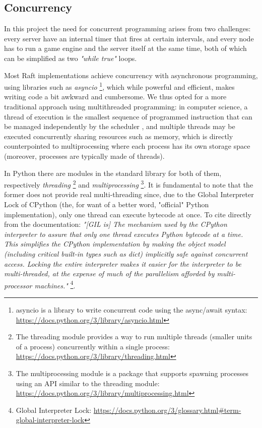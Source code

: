 \subsection{Concurrency} \label{sec:threading}

In this project the need for concurrent programming arises from two challenges: every server have an internal timer that fires at certain intervals, and every node has to run a game engine and the server itself at the same time, both of which can be simplified as two \textit{"while true"} loops. 

Most Raft implementations achieve concurrency with asynchronous programming, using libraries such as \textit{asyncio} \footnote{asyncio is a library to write concurrent code using the async/await syntax: \url{https://docs.python.org/3/library/asyncio.html}}, which while powerful and efficient, makes writing code a bit awkward and cumbersome. We thus opted for a more traditional approach using multithreaded programming: in computer science, a thread of execution is the smallest sequence of programmed instruction that can be managed independently by the scheduler \cite{lamportMultiprocessor}, and multiple threads may be executed concurrently sharing resources such as memory, which is directly counterpointed to multiprocessing where each process has its own storage space (moreover, processes are typically made of threads). 

In Python there are modules in the standard library for both of them, respectively \textit{threading} \footnote{The threading module provides a way to run multiple threads (smaller units of a process) concurrently within a single process: \url{https://docs.python.org/3/library/threading.html}} and \textit{multiprocessing} \footnote{The multiprocessing module is a package that supports spawning processes using an API similar to the threading module: \url{https://docs.python.org/3/library/multiprocessing.html}}. It is fundamental to note that the former does not provide real multi-threading since, due to the Global Interpreter Lock of CPython (the, for want of a better word, "official" Python implementation), only one thread can execute bytecode at once. To cite directly from the documentation: \textit{"[GIL is] The mechanism used by the CPython interpreter to assure that only one thread executes Python bytecode at a time. This simplifies the CPython implementation by making the object model (including critical built-in types such as dict) implicitly safe against concurrent access. Locking the entire interpreter makes it easier for the interpreter to be multi-threaded, at the expense of much of the parallelism afforded by multi-processor machines."} \footnote{Global Interpreter Lock: \url{https://docs.python.org/3/glossary.html\#term-global-interpreter-lock}}.

